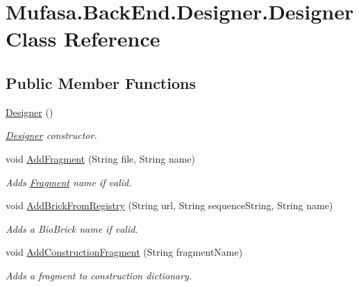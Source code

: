 \hypertarget{class_mufasa_1_1_back_end_1_1_designer_1_1_designer}{\section{Mufasa.\+Back\+End.\+Designer.\+Designer Class Reference}
\label{class_mufasa_1_1_back_end_1_1_designer_1_1_designer}
}
\subsection*{Public Member Functions}
\begin{DoxyCompactItemize}
\item 
\hyperlink{class_mufasa_1_1_back_end_1_1_designer_1_1_designer_a816cd5a38883f006b0485ce15308e16a}{Designer} ()
\begin{DoxyCompactList}\small\item\em \hyperlink{class_mufasa_1_1_back_end_1_1_designer_1_1_designer}{Designer} constructor. \end{DoxyCompactList}\item 
void \hyperlink{class_mufasa_1_1_back_end_1_1_designer_1_1_designer_a09142fb5f89fc4fdf478f1fa192c215e}{Add\+Fragment} (String file, String name)
\begin{DoxyCompactList}\small\item\em Adds \hyperlink{class_mufasa_1_1_back_end_1_1_designer_1_1_fragment}{Fragment} {\itshape name}  if valid. \end{DoxyCompactList}\item 
void \hyperlink{class_mufasa_1_1_back_end_1_1_designer_1_1_designer_a15c6a95d7013f59fc751cb38ab9b869e}{Add\+Brick\+From\+Registry} (String url, String sequence\+String, String name)
\begin{DoxyCompactList}\small\item\em Adds a Bio\+Brick {\itshape name}  if valid. \end{DoxyCompactList}\item 
void \hyperlink{class_mufasa_1_1_back_end_1_1_designer_1_1_designer_a222f30b4cdf638c515f9ff3393b21564}{Add\+Construction\+Fragment} (String fragment\+Name)
\begin{DoxyCompactList}\small\item\em Adds a fragment to construction dictionary. \end{DoxyCompactList}\end{DoxyCompactItemize}
